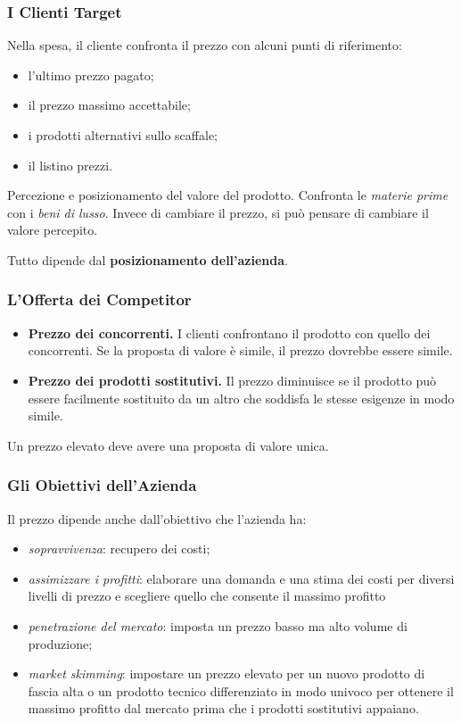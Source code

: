\documentclass[a4paper,portrait,12pt]{article}
\theoremstyle{definition}
\begin{document}
\subsubsection{I Clienti Target}
Nella spesa, il cliente confronta il prezzo con alcuni punti di riferimento:
\begin{itemize}
\item l'ultimo prezzo pagato;
\item il prezzo massimo accettabile;
\item i prodotti alternativi sullo scaffale;
\item il listino prezzi.
\end{itemize}

Percezione e posizionamento del valore del prodotto.
Confronta le \emph{materie prime} con i \emph{beni di lusso}.
Invece di cambiare il prezzo, si può pensare di cambiare il valore percepito.

Tutto dipende dal \textbf{posizionamento dell'azienda}.

\subsubsection{L'Offerta dei Competitor}
\begin{itemize}
\item \textbf{Prezzo dei concorrenti.} I clienti confrontano il prodotto con quello dei concorrenti.
Se la proposta di valore è simile, il prezzo dovrebbe essere simile.
\item \textbf{Prezzo dei prodotti sostitutivi.} Il prezzo diminuisce se il prodotto può essere facilmente sostituito da un altro che soddisfa le stesse esigenze in modo simile.
\end{itemize}
Un prezzo elevato deve avere una proposta di valore unica.

\subsubsection{Gli Obiettivi dell'Azienda}
Il prezzo dipende anche dall'obiettivo che l'azienda ha:
\begin{itemize}
\item \emph{sopravvivenza}: recupero dei costi;
\item \emph{assimizzare i profitti}: elaborare una domanda e una stima dei costi per diversi livelli di prezzo e scegliere quello che consente il massimo profitto
\item \emph{penetrazione del mercato}: imposta un prezzo basso ma alto volume di produzione;
\item \emph{market skimming}: impostare un prezzo elevato per un nuovo prodotto di fascia alta o un prodotto tecnico differenziato in modo univoco per ottenere il massimo profitto dal mercato prima che i prodotti sostitutivi appaiano.
\end{itemize}
\end{document}
